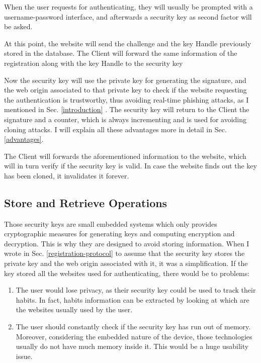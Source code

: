 When the user requests for authenticating, they will usually be prompted with a username-password interface, and afterwards a security key as second factor will be asked.

At this point, the website will send the challenge and the key Handle previously stored in the database. The Client will forward the same information of the registration along with the key Handle to the security key

Now the security key will use the private key for generating the signature, and the web origin associated to that private key to check if the website requesting the authentication is trustworthy, thus avoiding real-time phishing attacks, as I mentioned in Sec. \ref{introduction} \cite{reailton2015phishing}. The security key will return to the Client the signature and a counter, which is always incrementing and is used for avoiding cloning attacks. I will explain all these advantages more in detail in Sec. \ref{advantages}.

The Client will forwards the aforementioned information to the website, which will in turn verify if the security key is valid. In case the website finds out the key has been cloned, it invalidates it forever.

\subsection{Store and Retrieve Operations}\label{key-handle}
Those security keys are small embedded systems which only provides cryptographic measures for generating keys and computing encryption and decryption. This is why they are designed to avoid storing information. When I wrote in Sec. \ref{registration-protocol} to assume that the security key stores the private key and the web origin associated with it, it was a simplification. If the key stored all the websites used for authenticating, there would be to problems:
\begin{enumerate}
    \item The user would lose privacy, as their security key could be used to track their habits. In fact, habits information can be extracted by looking at which are the websites usually used by the user.
    \item The user should constantly check if the security key has run out of memory. Moreover, considering the embedded nature of the device, those technologies usually do not have much memory inside it. This would be a huge usability issue.
\end{enumerate}

